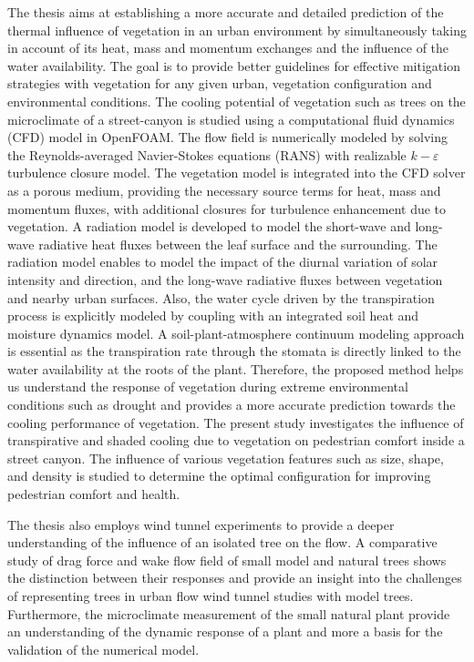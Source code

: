 The thesis aims at establishing a more accurate and detailed prediction of the thermal influence of vegetation in an urban environment by simultaneously taking in account of its heat, mass and momentum exchanges and the influence of the water availability. The goal is to provide better guidelines for effective mitigation strategies with vegetation for any given urban, vegetation configuration and environmental conditions. The cooling potential of vegetation such as trees on the microclimate of a street-canyon is studied using a computational fluid dynamics (CFD) model in OpenFOAM. The flow field is numerically modeled by solving the Reynolds-averaged Navier-Stokes equations (RANS) with realizable $k-\varepsilon$ turbulence closure model. The vegetation model is integrated into the CFD solver as a porous medium, providing the necessary source terms for heat, mass and momentum fluxes, with additional closures for turbulence enhancement due to vegetation. A radiation model is developed to model the short-wave and long-wave radiative heat fluxes between the leaf surface and the surrounding. The radiation model enables to model the impact of the diurnal variation of solar intensity and direction, and the long-wave radiative fluxes between vegetation and nearby urban surfaces. Also, the water cycle driven by the transpiration process is explicitly modeled by coupling with an integrated soil heat and moisture dynamics model. A soil-plant-atmosphere continuum modeling approach is essential as the transpiration rate through the stomata is directly linked to the water availability at the roots of the plant. Therefore, the proposed method helps us understand the response of vegetation during extreme environmental conditions such as drought and provides a more accurate prediction towards the cooling performance of vegetation. The present study investigates the influence of transpirative and shaded cooling due to vegetation on pedestrian comfort inside a street canyon. The influence of various vegetation features such as size, shape, and density is studied to determine the optimal configuration for improving pedestrian comfort and health.

The thesis also employs wind tunnel experiments to provide a deeper understanding of the influence of an isolated tree on the flow. A comparative study of drag force and wake flow field of small model and natural trees shows the distinction between their responses and provide an insight into the challenges of representing trees in urban flow wind tunnel studies with model trees. Furthermore, the microclimate measurement of the small natural plant provide an understanding of the dynamic response of a plant and more a basis for the validation of the numerical model.

